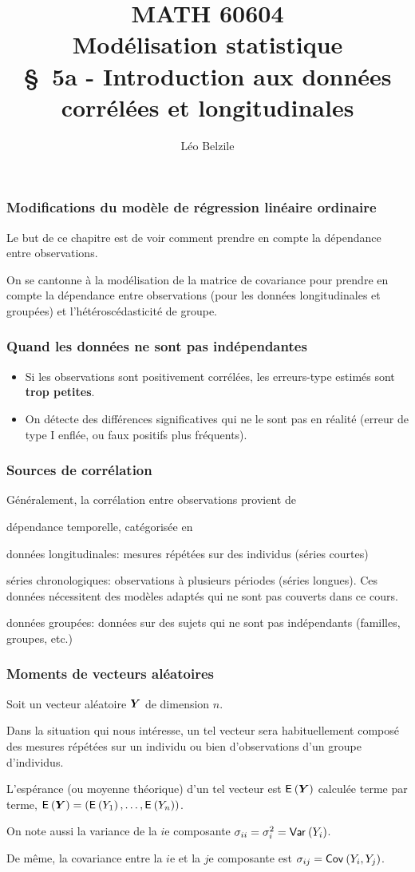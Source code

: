 \documentclass{beamer}
\title[\color{white}{MATH 60604 \S~5a - Introduction aux données corrélées et longitudinales}]{\texorpdfstring{MATH 60604 \\Modélisation statistique \\ \S~5a - Introduction aux données corrélées et longitudinales}{MATH 60604 \\Modélisation statistique \\ \S~5a - Introduction aux données corrélées et longitudinales}}
\author{Léo Belzile}
\institute{HEC Montréal\\
Département de sciences de la décision}
\date{}
\begin{document}
\frame{\titlepage}

\begin{frame}
\frametitle{Modifications du modèle de régression linéaire ordinaire}
\bi 
\item Le but de ce chapitre est de voir comment prendre en compte la dépendance entre observations.
\item On se cantonne à la modélisation de la matrice de covariance pour prendre en compte la dépendance entre observations (pour les données longitudinales et groupées) et l'hétéroscédasticité de groupe.
\ei
\end{frame}
\begin{frame}
\frametitle{Quand les données ne sont pas indépendantes}
\begin{itemize}
\item Si les observations sont positivement corrélées, les erreurs-type estimés sont \textbf{trop petites}.
\item On détecte des différences significatives qui ne le sont pas en réalité (erreur de type I enflée, ou faux positifs plus fréquents).
\end{itemize}
\end{frame}
\begin{frame}
\frametitle{Sources de corrélation}
Généralement, la corrélation entre observations provient de
\bi
\item  dépendance temporelle, catégorisée en
\bi 
\item données longitudinales: mesures répétées sur des individus (séries courtes)
\item séries chronologiques: observations à plusieurs périodes (séries longues). Ces données nécessitent des modèles adaptés qui ne sont pas couverts dans ce cours.
\ei 
\item  données groupées: données sur des sujets qui ne sont pas indépendants (familles, groupes, etc.)
\ei
\end{frame}
\begin{frame}
\frametitle{Moments de vecteurs aléatoires}
\bi
\item Soit un vecteur aléatoire $\boldsymbol {Y}$ de dimension $n$. 
\bi
\item Dans la situation qui nous intéresse, un tel vecteur sera habituellement
composé des mesures répétées sur un individu ou bien d'observations d'un
groupe d'individus. 
\ei
\item L'espérance (ou moyenne théorique) d'un tel vecteur est ${\mathsf E}_{}\left(\boldsymbol {Y}\right)$ calculée terme par terme, ${\mathsf E}_{}\left(\boldsymbol {Y}\right) = ({\mathsf E}_{}\left(Y_1\right), \ldots, {\mathsf E}_{}\left(Y_n\right))$.
\item On note aussi la variance de la $i$e composante $\sigma_{ii} = \sigma^2_i={\mathsf{Var}_{}}\left(Y_i\right)$.
\item De même, la covariance entre la $i$e et la $j$e composante est  $\sigma_{ij}={\mathsf{Cov}_{}}\left(Y_i, Y_j\right)$.
\ei
\end{frame}
\end{document}
